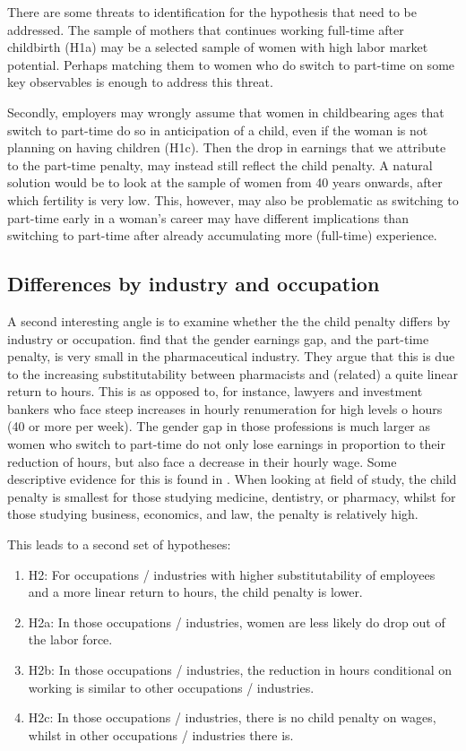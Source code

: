 \documentclass[10pt]{article}
\begin{document}
There are some threats to identification for the hypothesis that need to be addressed. The sample of mothers that continues working full-time after childbirth (H1a) may be a selected sample of women with high labor market potential. Perhaps matching them to women who do switch to part-time on some key observables is enough to address this threat.

Secondly, employers may wrongly assume that women in childbearing ages that switch to part-time do so in anticipation of a child, even if the woman is not planning on having children (H1c). Then the drop in earnings that we attribute to the part-time penalty, may instead still reflect the child penalty. A natural solution would be to look at the sample of women from 40 years onwards, after which fertility is very low. This, however, may also be problematic as switching to part-time early in a woman's career may have different implications than switching to part-time after already accumulating more (full-time) experience.

\subsection{Differences by industry and occupation}
A second interesting angle is to examine whether the the child penalty differs by industry or occupation. \cite{goldin2016most} find that the gender earnings gap, and the part-time penalty, is very small in the pharmaceutical industry. They argue that this is due to the increasing substitutability between pharmacists and (related) a quite linear return to hours. This is as opposed to, for instance, lawyers and investment bankers who face steep increases in hourly renumeration for high levels o hours (40 or more per week). The gender gap in those professions is much larger as women who switch to part-time do not only lose earnings in proportion to their reduction of hours, but also face a decrease in their hourly wage. Some descriptive evidence for this is found in \cite{artmann2022household}. When looking at field of study, the child penalty is smallest for those studying medicine, dentistry, or pharmacy, whilst for those studying business, economics, and law, the penalty is relatively high.

This leads to a second set of hypotheses:
\begin{enumerate}
    \item H2: For occupations / industries with higher substitutability of employees and a more linear return to hours, the child penalty is lower.
    \item H2a: In those occupations / industries, women are less likely do drop out of the labor force.
    \item H2b: In those occupations / industries, the reduction in hours conditional on working is similar to other occupations / industries.
    \item H2c: In those occupations / industries, there is no child penalty on wages, whilst in other occupations / industries there is.
\end{enumerate}
\end{document}
